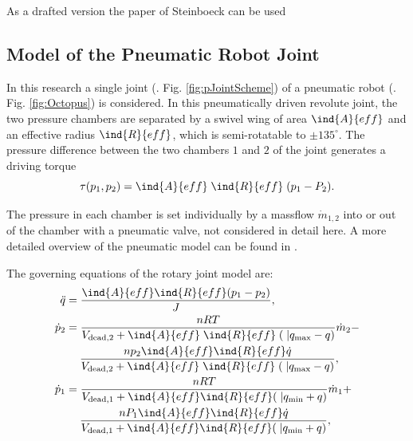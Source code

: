 \documentclass[conference]{IEEEtran}
\newcommand{\Aeff}{\ind{A}{eff} }
\newcommand{\Reff}{\ind{R}{eff}}
\newcommand{\abs}{|}
\begin{document}
As a drafted version the paper of Steinboeck can be used \cite{STADLER2022105071}

\subsection{Model of the Pneumatic Robot Joint}

In this research a single joint (\cf. Fig. \ref{fig:pJointScheme}) of
a pneumatic robot (\cf. Fig. \ref{fig:Octopus}) is considered.  In
this pneumatically driven revolute joint, the two pressure chambers
are separated by a swivel wing of area $\Aeff$ and an effective radius
$\Reff$, which is semi-rotatable to $\pm 135^\circ$. The pressure
difference between the two chambers $1$ and $2$ of the joint generates
a driving torque
\begin{equation}\label{drvtrq}
\tau(p_1, p_2) = \Aeff \; \Reff \; (p_1-P_2).
\end{equation}

The pressure in each chamber is set individually by a massflow
$\dot m_{1,2}$ into or out of the chamber with a pneumatic valve, not
considered in detail here. A more detailed overview of the pneumatic
model can be found in \cite{Hoffmann2021}.

The governing equations of the rotary joint model are:
\begin{subequations} \label{pJointMdl}
  \begin{align}
    \ddot q  & =  \frac{\Aeff\Reff (p_1-p_2)}{J} , \\
    \nonumber
    \dot p_2 &= \frac{n  R T}{V_{\mathrm {dead,2}} + \Aeff\;\Reff\;(\;\abs{q_{\mathrm {max}}}-q)}  \dot{m}_2 - \\ \label{dp2}
                  & \;\quad \frac{n  p_2  \Aeff \Reff \dot q}{V_{\mathrm{dead,2}} + \Aeff\;\Reff\;( \;\abs{q_{\mathrm{max}}}-q)} ,\\
    \nonumber
    \dot p_1 &= \frac{n  R T}{V_{\mathrm {dead,1}} +  \Aeff\Reff(\;\abs{q_{\mathrm {min}}}+q)}  \dot{m}_1 +  \\\label{dp1}
        & \;\quad \frac{n  P_1  \Aeff \Reff  \dot q}{V_{\mathrm {dead,1}} +  \Aeff\Reff(\;\abs{q_{\mathrm {min}}}+q)}       ,
  \end{align}
\end{subequations}
\end{document}
